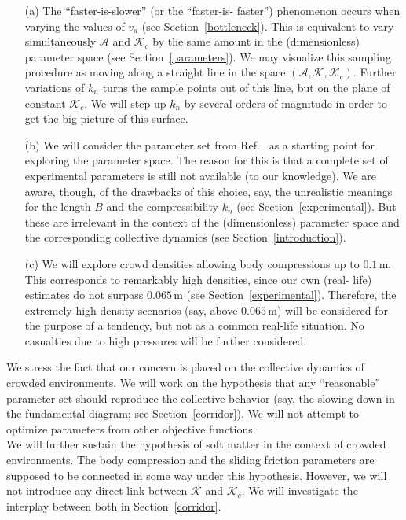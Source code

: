 \documentclass[preprint,12pt]{elsarticle}
\begin{document}
\begin{itemize}  \item[(a)] The ``faster-is-slower'' (or the ``faster-is-
faster'') phenomenon  occurs when varying the values of $v_d$ (see
Section~\ref{bottleneck}). This is  equivalent to vary simultaneously
$\mathcal{A}$ and $\mathcal{K}_c$ by the same  amount in the (dimensionless)
parameter space (see Section~\ref{parameters}). We  may visualize this sampling
procedure as moving along a straight line in the  space
$(\mathcal{A},\mathcal{K},\mathcal{K}_c)$. Further variations of  $k_n$ turns
the sample points out of this line, but on the plane of constant
$\mathcal{K}_c$. We will step up $k_n$ by several orders of magnitude in order
to get the big picture of this surface.

\item[(b)] We will consider the parameter set from Ref.~\cite{helbing_2000}  as
a starting point for exploring the parameter space. The reason for this is  that
a complete set of experimental parameters is still not available (to our
knowledge). We are aware, though, of the drawbacks of this choice, say, the
unrealistic meanings for the length $B$ and the compressibility $k_n$ (see
Section~\ref{experimental}). But these are irrelevant in the context of the
(dimensionless) parameter space and the corresponding collective dynamics (see
Section~\ref{introduction}).

\item[(c)] We will explore crowd densities allowing body compressions up to
$0.1\,$m. This corresponds to remarkably high densities, since our own  (real-
life) estimates do not surpass $0.065\,$m (see  Section~\ref{experimental}).
Therefore, the extremely high density  scenarios (say, above $0.065\,$m) will be
considered for the purpose of a  tendency, but not as a common real-life
situation. No casualties due to high  pressures will be further considered.

\end{itemize}

We stress the fact that our concern is placed on the collective dynamics of
crowded environments. We will work on the hypothesis that any ``reasonable''
parameter set should reproduce the collective behavior (say, the slowing down
in the fundamental diagram; see Section~\ref{corridor}). We will not attempt to
optimize parameters from other objective functions. \\

We will further sustain the hypothesis of soft matter in the context of crowded
environments. The body compression and the sliding friction parameters are
supposed to be connected in some way under this hypothesis. However, we will
not introduce any direct link between $\mathcal{K}$ and $\mathcal{K}_c$. We
will investigate the interplay between both in Section~\ref{corridor}.  \\
\end{document}
